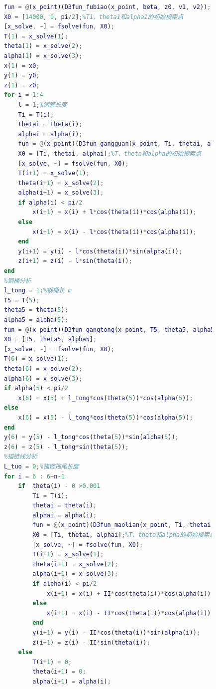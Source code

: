 \documentclass[UTF8]{ctexbook}
\theoremstyle{nonumberplain}
\begin{document}
\begin{lstlisting}[language = Matlab]
            %浮标、钢管分析
            fun = @(x_point)(D3fun_fubiao(x_point, beta, z0, v1, v2));
            X0 = [14000, 0, pi/2];%T1、theta1和alpha1的初始搜索点
            [x_solve, ~] = fsolve(fun, X0);
            T(1) = x_solve(1);
            theta(1) = x_solve(2);
            alpha(1) = x_solve(3);
            x(1) = x0;
            y(1) = y0;
            z(1) = z0;
            for i = 1:4
                l = 1;%钢管长度
                Ti = T(i);
                thetai = theta(i);
                alphai = alpha(i);
                fun = @(x_point)(D3fun_gangguan(x_point, Ti, thetai, alphai, beta, v2));
                X0 = [Ti, thetai, alphai];%T、theta和alpha的初始搜索点
                [x_solve, ~] = fsolve(fun, X0);
                T(i+1) = x_solve(1);
                theta(i+1) = x_solve(2);
                alpha(i+1) = x_solve(3);
                if alpha(i) < pi/2
                    x(i+1) = x(i) + l*cos(theta(i))*cos(alpha(i));
                else
                    x(i+1) = x(i) - l*cos(theta(i))*cos(alpha(i));
                end
                y(i+1) = y(i) - l*cos(theta(i))*sin(alpha(i));
                z(i+1) = z(i) - l*sin(theta(i));
            end
            %钢桶分析
            l_tong = 1;%钢桶长 m
            T5 = T(5);
            theta5 = theta(5);
            alpha5 = alpha(5);
            fun = @(x_point)(D3fun_gangtong(x_point, T5, theta5, alpha5, beta, v2, m_qiu));
            X0 = [T5, theta5, alpha5];
            [x_solve, ~] = fsolve(fun, X0);
            T(6) = x_solve(1);
            theta(6) = x_solve(2);
            alpha(6) = x_solve(3);
            if alpha(5) < pi/2
                x(6) = x(5) + l_tong*cos(theta(5))*cos(alpha(5));
            else
                x(6) = x(5) - l_tong*cos(theta(5))*cos(alpha(5));
            end
            y(6) = y(5) - l_tong*cos(theta(5))*sin(alpha(5));
            z(6) = z(5) - l_tong*sin(theta(5));
            %锚链线分析
            L_tuo = 0;%锚链拖尾长度
            for i = 6 : 6+n-1
                if  theta(i) - 0 >0.001
                    Ti = T(i);
                    thetai = theta(i);
                    alphai = alpha(i);
                    fun = @(x_point)(D3fun_maolian(x_point, Ti, thetai, alphai, I));
                    X0 = [Ti, thetai, alphai];%T、theta和alpha的初始搜索点
                    [x_solve, ~] = fsolve(fun, X0);
                    T(i+1) = x_solve(1);
                    theta(i+1) = x_solve(2);
                    alpha(i+1) = x_solve(3);
                    if alpha(i) < pi/2
                        x(i+1) = x(i) + II*cos(theta(i))*cos(alpha(i));
                    else
                        x(i+1) = x(i) - II*cos(theta(i))*cos(alpha(i));
                    end
                    y(i+1) = y(i) - II*cos(theta(i))*sin(alpha(i));
                    z(i+1) = z(i) - II*sin(theta(i));
                else
                    T(i+1) = 0;
                    theta(i+1) = 0;
                    alpha(i+1) = alpha(i);


\end{lstlisting}
\end{document}
